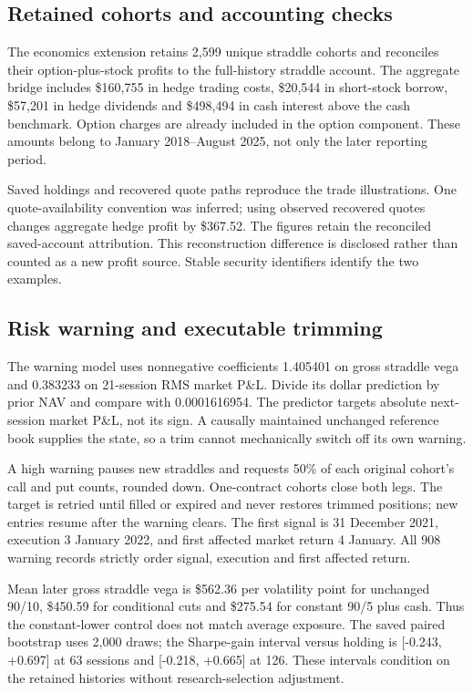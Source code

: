 \documentclass[11pt,letterpaper]{article}
\begin{document}
\subsection*{Retained cohorts and accounting checks}
The economics extension retains 2,599 unique straddle cohorts and reconciles their option-plus-stock profits to the full-history straddle account. The aggregate bridge includes \$160,755 in hedge trading costs, \$20,544 in short-stock borrow, \$57,201 in hedge dividends and \$498,494 in cash interest above the cash benchmark. Option charges are already included in the option component. These amounts belong to January 2018--August 2025, not only the later reporting period.

Saved holdings and recovered quote paths reproduce the trade illustrations. One quote-availability convention was inferred; using observed recovered quotes changes aggregate hedge profit by \$367.52. The figures retain the reconciled saved-account attribution. This reconstruction difference is disclosed rather than counted as a new profit source. Stable security identifiers identify the two examples.

\subsection*{Risk warning and executable trimming}
The warning model uses nonnegative coefficients 1.405401 on gross straddle vega and 0.383233 on 21-session RMS market P\&L. Divide its dollar prediction by prior NAV and compare with 0.0001616954. The predictor targets absolute next-session market P\&L, not its sign. A causally maintained unchanged reference book supplies the state, so a trim cannot mechanically switch off its own warning.

A high warning pauses new straddles and requests 50\% of each original cohort's call and put counts, rounded down. One-contract cohorts close both legs. The target is retried until filled or expired and never restores trimmed positions; new entries resume after the warning clears. The first signal is 31 December 2021, execution 3 January 2022, and first affected market return 4 January. All 908 warning records strictly order signal, execution and first affected return.

Mean later gross straddle vega is \$562.36 per volatility point for unchanged 90/10, \$450.59 for conditional cuts and \$275.54 for constant 90/5 plus cash. Thus the constant-lower control does not match average exposure. The saved paired bootstrap uses 2,000 draws; the Sharpe-gain interval versus holding is [-0.243, +0.697] at 63 sessions and [-0.218, +0.665] at 126. These intervals condition on the retained histories without research-selection adjustment.
\end{document}
